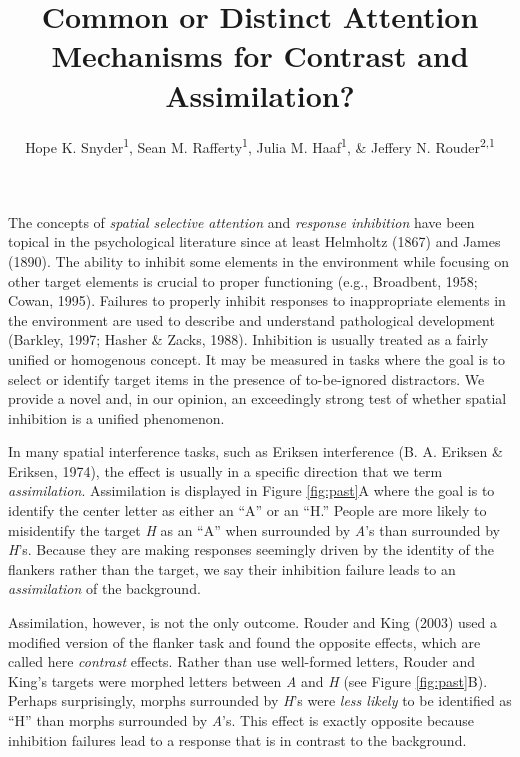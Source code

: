 \documentclass[english,floatsintext,man]{apa6}
\title{Common or Distinct Attention Mechanisms for Contrast and Assimilation?}
\author{Hope K. Snyder\textsuperscript{1}, Sean M. Rafferty\textsuperscript{1}, Julia M. Haaf\textsuperscript{1}, \& Jeffery N. Rouder\textsuperscript{2,1}}
\affiliation{
    \vspace{0.5cm}
          \textsuperscript{1} University of Missouri\\
          \textsuperscript{2} University of California, Irvine  }
\theoremstyle{definition}
\theoremstyle{definition}
\theoremstyle{remark}
\begin{document}
\maketitle

\setcounter{secnumdepth}{0}



The concepts of \emph{spatial selective attention} and \emph{response
inhibition} have been topical in the psychological literature since at
least Helmholtz (1867) and James (1890). The ability to inhibit some
elements in the environment while focusing on other target elements is
crucial to proper functioning (e.g., Broadbent, 1958; Cowan, 1995).
Failures to properly inhibit responses to inappropriate elements in the
environment are used to describe and understand pathological development
(Barkley, 1997; Hasher \& Zacks, 1988). Inhibition is usually treated as
a fairly unified or homogenous concept. It may be measured in tasks
where the goal is to select or identify target items in the presence of
to-be-ignored distractors. We provide a novel and, in our opinion, an
exceedingly strong test of whether spatial inhibition is a unified
phenomenon.

In many spatial interference tasks, such as Eriksen interference (B. A.
Eriksen \& Eriksen, 1974), the effect is usually in a specific direction
that we term \emph{assimilation}. Assimilation is displayed in Figure
\ref{fig:past}A where the goal is to identify the center letter as
either an \enquote{A} or an \enquote{H.} People are more likely to
misidentify the target \emph{H} as an \enquote{A} when surrounded by
\emph{A}'s than surrounded by \emph{H}'s. Because they are making
responses seemingly driven by the identity of the flankers rather than
the target, we say their inhibition failure leads to an
\emph{assimilation} of the background.

Assimilation, however, is not the only outcome. Rouder and King (2003)
used a modified version of the flanker task and found the opposite
effects, which are called here \emph{contrast} effects. Rather than use
well-formed letters, Rouder and King's targets were morphed letters
between \emph{A} and \emph{H} (see Figure \ref{fig:past}B). Perhaps
surprisingly, morphs surrounded by \emph{H}'s were \emph{less likely} to
be identified as \enquote{H} than morphs surrounded by \emph{A}'s. This
effect is exactly opposite because inhibition failures lead to a
response that is in contrast to the background.
\end{document}
